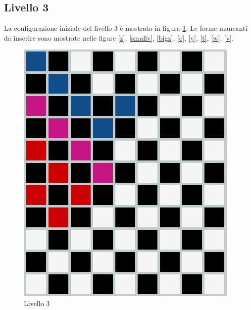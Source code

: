 \subsection{Livello 3}
La configurazione iniziale del livello 3 è mostrata in figura \ref{lev3}. Le forme mancanti da inserire sono mostrate nelle figure \ref{z}, \ref{smallv}, \ref{bigz}, \ref{c}, \ref{y}, \ref{t}, \ref{w}, \ref{v}.
\begin{figure}[h]
	\centering
	\includegraphics[scale=0.3]{immagini/lv3}
	\caption{Livello 3}
	\label{lev3}
\end{figure}

